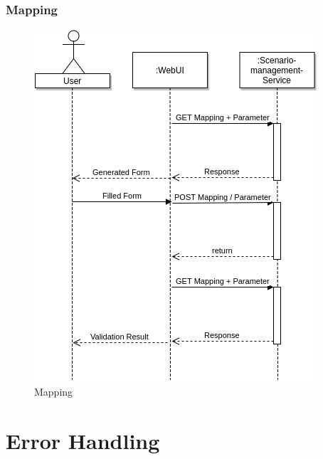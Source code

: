 \subsubsection{Mapping}
\begin{figure}[H]
	\centering\includegraphics[width=.65\textwidth]{res/Mapping}
	\caption{Mapping}
	\label{fig:mapping}
\end{figure}




\section{Error Handling}
